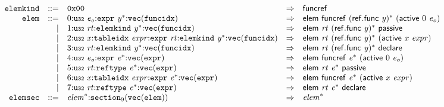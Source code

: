 $$
\begin{array}{@{}l@{}rrlll@{}l@{}}
& {\mathtt{elemkind}} &::=& \mathtt{0x00} &\Rightarrow& \mathsf{funcref} \\
& {\mathtt{elem}} &::=& 0{:}{\mathtt{u{\scriptstyle32}}}~{\mathit{e}}_{{\mathit{o}}}{:}{\mathtt{expr}}~{{\mathit{y}}^\ast}{:}{\mathtt{vec}}({\mathtt{funcidx}}) &\Rightarrow& \mathsf{elem}~\mathsf{funcref}~{(\mathsf{ref.func}~{\mathit{y}})^\ast}~(\mathsf{active}~0~{\mathit{e}}_{{\mathit{o}}}) \\ &&|&
1{:}{\mathtt{u{\scriptstyle32}}}~{\mathit{rt}}{:}{\mathtt{elemkind}}~{{\mathit{y}}^\ast}{:}{\mathtt{vec}}({\mathtt{funcidx}}) &\Rightarrow& \mathsf{elem}~{\mathit{rt}}~{(\mathsf{ref.func}~{\mathit{y}})^\ast}~\mathsf{passive} \\ &&|&
2{:}{\mathtt{u{\scriptstyle32}}}~{\mathit{x}}{:}{\mathtt{tableidx}}~{\mathit{expr}}{:}{\mathtt{expr}}~{\mathit{rt}}{:}{\mathtt{elemkind}}~{{\mathit{y}}^\ast}{:}{\mathtt{vec}}({\mathtt{funcidx}}) &\Rightarrow& \mathsf{elem}~{\mathit{rt}}~{(\mathsf{ref.func}~{\mathit{y}})^\ast}~(\mathsf{active}~{\mathit{x}}~{\mathit{expr}}) \\ &&|&
3{:}{\mathtt{u{\scriptstyle32}}}~{\mathit{rt}}{:}{\mathtt{elemkind}}~{{\mathit{y}}^\ast}{:}{\mathtt{vec}}({\mathtt{funcidx}}) &\Rightarrow& \mathsf{elem}~{\mathit{rt}}~{(\mathsf{ref.func}~{\mathit{y}})^\ast}~\mathsf{declare} \\ &&|&
4{:}{\mathtt{u{\scriptstyle32}}}~{\mathit{e}}_{{\mathit{o}}}{:}{\mathtt{expr}}~{{\mathit{e}}^\ast}{:}{\mathtt{vec}}({\mathtt{expr}}) &\Rightarrow& \mathsf{elem}~\mathsf{funcref}~{{\mathit{e}}^\ast}~(\mathsf{active}~0~{\mathit{e}}_{{\mathit{o}}}) \\ &&|&
5{:}{\mathtt{u{\scriptstyle32}}}~{\mathit{rt}}{:}{\mathtt{reftype}}~{{\mathit{e}}^\ast}{:}{\mathtt{vec}}({\mathtt{expr}}) &\Rightarrow& \mathsf{elem}~{\mathit{rt}}~{{\mathit{e}}^\ast}~\mathsf{passive} \\ &&|&
6{:}{\mathtt{u{\scriptstyle32}}}~{\mathit{x}}{:}{\mathtt{tableidx}}~{\mathit{expr}}{:}{\mathtt{expr}}~{{\mathit{e}}^\ast}{:}{\mathtt{vec}}({\mathtt{expr}}) &\Rightarrow& \mathsf{elem}~\mathsf{funcref}~{{\mathit{e}}^\ast}~(\mathsf{active}~{\mathit{x}}~{\mathit{expr}}) \\ &&|&
7{:}{\mathtt{u{\scriptstyle32}}}~{\mathit{rt}}{:}{\mathtt{reftype}}~{{\mathit{e}}^\ast}{:}{\mathtt{vec}}({\mathtt{expr}}) &\Rightarrow& \mathsf{elem}~{\mathit{rt}}~{{\mathit{e}}^\ast}~\mathsf{declare} \\
& {\mathtt{elemsec}} &::=& {{\mathit{elem}}^\ast}{:}{{\mathtt{section}}}_{9}({\mathtt{vec}}({\mathtt{elem}})) &\Rightarrow& {{\mathit{elem}}^\ast} \\
\end{array}
$$

